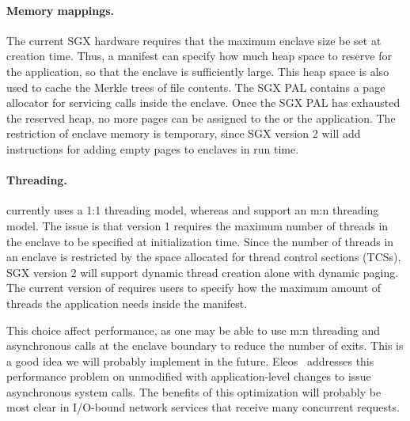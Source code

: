 \paragraph{Memory mappings.}
The current SGX hardware requires that the maximum enclave size 
be set at creation time.
Thus, 
a \graphenesgx{} manifest can specify how much heap space to reserve for the application,
so that the enclave is sufficiently large.
This heap space is also used to cache the Merkle trees of file contents.
The SGX PAL contains a page allocator
for servicing  calls inside the enclave.
Once the SGX PAL has exhausted the reserved heap,
no more pages can be assigned to the \libos{} or the application.
The restriction of enclave memory
is temporary, since SGX version 2 will add instructions for adding empty pages to enclaves in run time.

\paragraph{Threading.}
\graphenesgx{} currently uses a 1:1 threading model,
whereas \scone{} and \panoply{} support an m:n threading model.
The issue is that \sgx{} version 1 requires the maximum number of threads in the enclave
to be specified at initialization time.
Since the number of threads in an enclave is restricted
by the space allocated for thread control sections (TCSs),
SGX version 2 will support dynamic thread creation
alone with dynamic paging.
The current version of \graphenesgx{} requires users to specify how the maximum amount of threads the application needs inside the manifest.

This choice affect performance, as one may be able to use m:n threading and asynchronous calls at the enclave boundary
to reduce the number of exits.
This is a good idea we will probably implement in the future.
Eleos~\cite{orenbach17eleos} addresses this performance problem on unmodified \graphenesgx{} with 
application-level changes to issue asynchronous system calls.
The benefits of this %
optimization will probably be most clear in I/O-bound network services that receive many concurrent requests.



